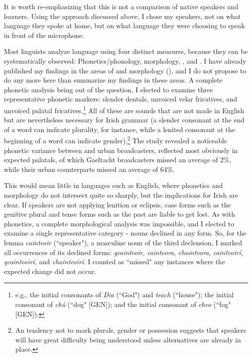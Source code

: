 \documentclass[output=paper,colorlinks,citecolor=brown]{langscibook}
\begin{document}
It is worth re-emphasizing that this is not a comparison of native speakers and learners. Using the \textit{} approach discussed above, I chose my speakers, not on what language they spoke at home, but on what language they were choosing to speak in front of the microphone.

Most linguists analyze language using four distinct measures, because they can be systematically observed: Phonetics/phonology, morphology, , and . I have already published my findings in the areas of and morphology  (\citealt{ob:OBroin2014b}), and I do not propose to do any more here than summarize my findings in these areas.  A complete phonetic analysis being out of the question, I elected to examine three representative phonetic markers: slender dentals, unvoiced velar fricatives, and unvoiced palatal fricatives.\footnote{e.g., the initial consonants of \textit{Dia} (``God") and \textit{teach} (``house"); the initial consonant of \textit{chú} (``dog" [GEN]); and the initial consonant of \textit{cheo} (``fog" [GEN]).} All of these are sounds that are not made in English but are nevertheless necessary for Irish grammar (a slender consonant at the end of a word can indicate plurality, for instance, while a lenited consonant at the beginning of a word can indicate gender).\footnote{An tendency not to mark plurals, gender or possession suggests that speakers will have great difficulty being understood unless alternatives are already in place.} The study revealed a noticeable phonetic variance between  and urban broadcasters, reflected most obviously in expected palatals, of which Gaeltacht broadcasters missed an average of 2\%, while their urban counterparts missed an average of 64\%.  

This would mean little in languages such as English, where phonetics and morphology do not intersect quite so sharply, but the implications for Irish are clear. If speakers are not applying lenition or eclipsis, case forms such as the genitive plural and tense forms such as the past are liable to get lost. As with phonetics, a complete morphological analysis was impossible, and I elected to examine a single representative category - nouns declined in any form. So, for the lemma \textit{cainteoir} (``speaker"), a masculine noun of the third declension, I marked all occurrences of its declined forms: \textit{gcainteoir, cainteora, chainteora, cainteoirí, gcainteoirí,} and \textit{chainteoirí}. I counted as ``missed" any instances where the expected change did not occur.
\end{document}
